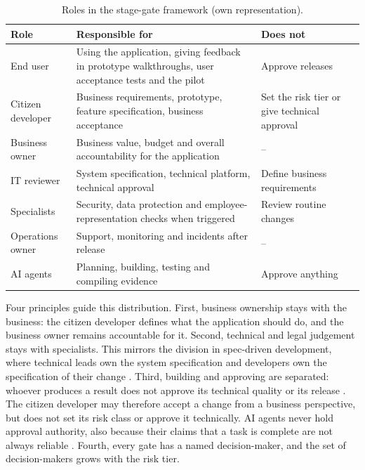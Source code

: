 \documentclass[10pt,a4paper]{article}
\begin{document}
\begin{table}[H]
    \centering
    \small
    \caption{Roles in the stage-gate framework (own representation).}
    \label{tab:stage-gate-roles}
    \begin{tabular}{p{3.2cm} p{6.0cm} p{4.4cm}}
    \hline
    \textbf{Role} & \textbf{Responsible for} & \textbf{Does not} \\
    \hline
    End user & Using the application, giving feedback in prototype walkthroughs, user acceptance tests and the pilot & Approve releases \\
    Citizen developer & Business requirements, prototype, feature specification, business acceptance & Set the risk tier or give technical approval \\
    Business owner & Business value, budget and overall accountability for the application & -- \\
    IT reviewer & System specification, technical platform, technical approval & Define business requirements \\
    Specialists & Security, data protection and employee-representation checks when triggered & Review routine changes \\
    Operations owner & Support, monitoring and incidents after release & -- \\
    AI agents & Planning, building, testing and compiling evidence & Approve anything \\
    \hline
    \end{tabular}
\end{table}

Four principles guide this distribution. First, business ownership stays with the business: the citizen developer defines what the application should do, and the business owner remains accountable for it. Second, technical and legal judgement stays with specialists. This mirrors the division in spec-driven development, where technical leads own the system specification and developers own the specification of their change \parencite{diaz2026}. Third, building and approving are separated: whoever produces a result does not approve its technical quality or its release \parencite{kang2026}. The citizen developer may therefore accept a change from a business perspective, but does not set its risk class or approve it technically. AI agents never hold approval authority, also because their claims that a task is complete are not always reliable \parencite{alhasan2026}. Fourth, every gate has a named decision-maker, and the set of decision-makers grows with the risk tier.
\end{document}
